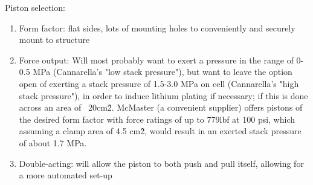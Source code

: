 Piston selection:
\begin{enumerate}
    \item Form factor: flat sides, lots of mounting holes to conveniently and securely mount to structure
    \item Force output: Will most probably want to exert a pressure in the range of 0-0.5 MPa (Cannarella's "low stack pressure"), but want to leave the option open of exerting a stack pressure of 1.5-3.0 MPa on cell (Cannarella's "high stack pressure"), in order to induce lithium plating if necessary; if this is done across an area of ~20cm\^2. McMaster (a convenient supplier) offers pistons of the desired form factor with force ratings of up to 779lbf at 100 psi, which assuming a clamp area of 4.5 cm\^2, would result in an exerted stack pressure of about 1.7 MPa.
    \item Double-acting: will allow the piston to both push and pull itself, allowing for a more automated set-up
\end{enumerate}
    
